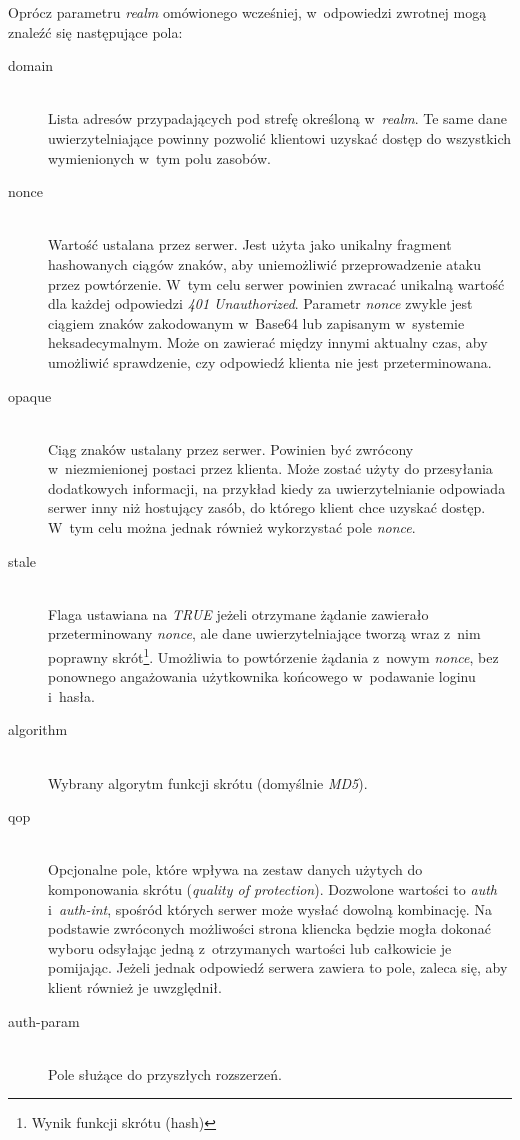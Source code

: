 \documentclass[11pt]{aghdpl}
\begin{document}
Oprócz parametru \emph{realm} omówionego wcześniej, w~odpowiedzi zwrotnej mogą znaleźć się następujące pola:
\begin{description}
\item[domain] \hfill \\
Lista adresów przypadających pod strefę określoną w~\emph{realm}. Te same dane uwierzytelniające powinny pozwolić klientowi uzyskać dostęp do wszystkich wymienionych w~tym polu zasobów.
\item[nonce] \hfill \\
Wartość ustalana przez serwer. Jest użyta jako unikalny fragment hashowanych ciągów znaków, aby uniemożliwić przeprowadzenie ataku przez powtórzenie. W~tym celu serwer powinien zwracać unikalną wartość dla każdej odpowiedzi \emph{401 Unauthorized}. Parametr \emph{nonce} zwykle jest ciągiem znaków zakodowanym w~Base64 lub zapisanym w~systemie heksadecymalnym. Może on zawierać między innymi aktualny czas, aby umożliwić sprawdzenie, czy odpowiedź klienta nie jest przeterminowana.
\item[opaque] \hfill \\
Ciąg znaków ustalany przez serwer. Powinien być zwrócony w~niezmienionej postaci przez klienta. Może zostać użyty do przesyłania dodatkowych informacji, na przykład kiedy za uwierzytelnianie odpowiada serwer inny niż hostujący zasób, do którego klient chce uzyskać dostęp. W~tym celu można jednak również wykorzystać pole \emph{nonce}.
\item[stale] \hfill \\
Flaga ustawiana na \emph{TRUE} jeżeli otrzymane żądanie zawierało przeterminowany \emph{nonce}, ale dane uwierzytelniające tworzą wraz z~nim poprawny skrót\footnote{Wynik funkcji skrótu (hash)}. Umożliwia to powtórzenie żądania z~nowym \emph{nonce}, bez ponownego angażowania użytkownika końcowego w~podawanie loginu i~hasła.
\item[algorithm] 
\hfill \\Wybrany algorytm funkcji skrótu (domyślnie \emph{MD5}).
\item[qop] \hfill \\
Opcjonalne pole, które wpływa na zestaw danych użytych do komponowania skrótu (\emph{quality of protection}). Dozwolone wartości to \emph{auth} i~\emph{auth-int}, spośród których serwer może wysłać dowolną kombinację. Na podstawie zwróconych możliwości strona kliencka będzie mogła dokonać wyboru odsyłając jedną z~otrzymanych wartości lub całkowicie je pomijając. Jeżeli jednak odpowiedź serwera zawiera to pole, zaleca się, aby klient również je uwzględnił.
\item[auth-param] \hfill \\
Pole służące do przyszłych rozszerzeń.
\end{description}
\end{document}
